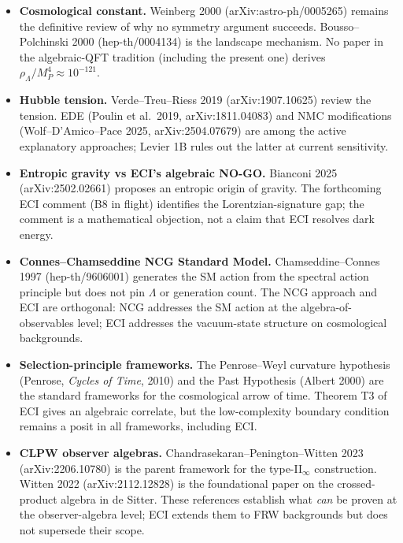 \begin{itemize}

\item \textbf{Cosmological constant.}
  Weinberg 2000 (arXiv:astro-ph/0005265) remains the definitive review
  of why no symmetry argument succeeds.  Bousso--Polchinski 2000
  (hep-th/0004134) is the landscape mechanism.  No paper in the
  algebraic-QFT tradition (including the present one) derives
  $\rho_\Lambda / M_P^4 \approx 10^{-121}$.

\item \textbf{Hubble tension.}
  Verde--Treu--Riess 2019 (arXiv:1907.10625) review the tension.
  EDE (Poulin et al.\ 2019, arXiv:1811.04083) and NMC modifications
  (Wolf--D'Amico--Pace 2025, arXiv:2504.07679) are among the active
  explanatory approaches; Levier 1B rules out the latter at current
  sensitivity.

\item \textbf{Entropic gravity vs ECI's algebraic NO-GO.}
  Bianconi 2025 (arXiv:2502.02661) proposes an entropic origin of
  gravity.  The forthcoming ECI comment (B8 in flight) identifies the
  Lorentzian-signature gap; the comment is a mathematical objection, not
  a claim that ECI resolves dark energy.

\item \textbf{Connes--Chamseddine NCG Standard Model.}
  Chamseddine--Connes 1997 (hep-th/9606001) generates the SM action from
  the spectral action principle but does not pin $\Lambda$ or generation
  count.  The NCG approach and ECI are orthogonal: NCG addresses the SM
  action at the algebra-of-observables level; ECI addresses the
  vacuum-state structure on cosmological backgrounds.

\item \textbf{Selection-principle frameworks.}
  The Penrose--Weyl curvature hypothesis (Penrose, \emph{Cycles of Time},
  2010) and the Past Hypothesis (Albert 2000) are the standard frameworks
  for the cosmological arrow of time.  Theorem T3 of ECI gives an algebraic
  correlate, but the low-complexity boundary condition remains a posit in
  all frameworks, including ECI.

\item \textbf{CLPW observer algebras.}
  Chandrasekaran--Penington--Witten 2023 (arXiv:2206.10780) is the parent
  framework for the type-II$_\infty$ construction.  Witten 2022
  (arXiv:2112.12828) is the foundational paper on the crossed-product
  algebra in de Sitter.  These references establish what \emph{can} be
  proven at the observer-algebra level; ECI extends them to FRW backgrounds
  but does not supersede their scope.

\end{itemize}

